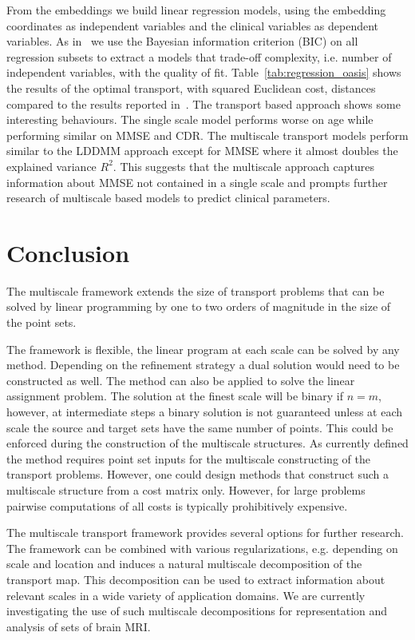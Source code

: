\documentclass[twoside,11pt]{article}
\begin{document}
From the embeddings we build linear regression models, using the embedding
coordinates as independent variables and the clinical variables as dependent
variables.  As in~\citet{gerber:media10} we use the Bayesian information
criterion (BIC) on all regression subsets to extract a models that trade-off
complexity, i.e. number of independent variables, with the quality of fit.
Table~\ref{tab:regression_oasis} shows the results of the optimal transport,
with squared Euclidean cost, distances compared to the results reported
in~\citet{gerber:media10}. The transport based approach shows some interesting
behaviours. The single scale model performs worse on age while performing
similar on MMSE and CDR. The multiscale transport models perform similar to the
LDDMM approach except for MMSE where it almost doubles the explained variance
$R^2$.  This suggests that the multiscale approach captures information about
MMSE not contained in a single scale and prompts further research of multiscale
based models to predict clinical parameters.


\section{Conclusion}
The multiscale framework extends the size of transport problems that can be
solved by linear programming by one to two orders of magnitude in the size of
the point sets. 

The framework is flexible, the linear program at each scale can be solved by
any method. Depending on the refinement strategy a dual solution would need to
be constructed as well. The method can also be applied to solve the linear
assignment problem. The solution at the finest scale will be binary if $n=m$,
however, at intermediate steps a binary solution is not guaranteed unless at
each scale the source and target sets have the same number of points. This
could be enforced during the construction of the multiscale structures. As
currently defined the method requires point set inputs for the multiscale
constructing of the transport problems. However, one could design methods that
construct such a multiscale structure from a cost matrix only. However, for
large problems pairwise computations of all costs is typically prohibitively
expensive.


The multiscale transport framework provides several options for further
research.  The framework can be combined with various regularizations, e.g.
depending on scale and location and induces a natural multiscale decomposition
of the transport map. This decomposition can be used to extract information
about relevant scales in a wide variety of application domains. We are
currently investigating the use of such multiscale decompositions for
representation and analysis of sets of brain MRI.
\end{document}
